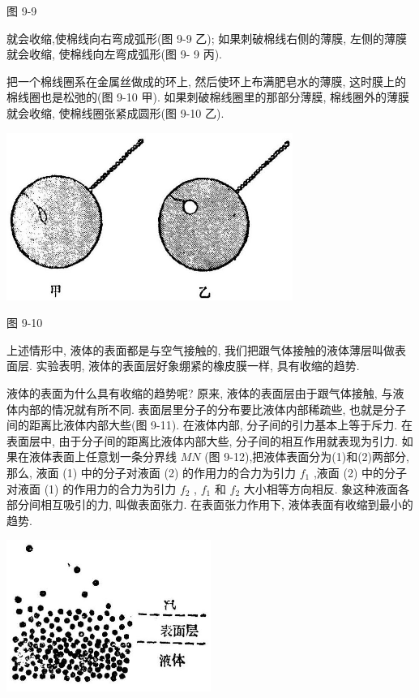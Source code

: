 \documentclass[10pt]{article}
\begin{document}
图 9-9

就会收缩,使棉线向右弯成弧形(图 9-9 乙); 如果刺破棉线右侧的薄膜, 左侧的薄膜就会收缩, 使棉线向左弯成弧形(图 9- 9 丙).

把一个棉线圈系在金属丝做成的环上, 然后使环上布满肥皂水的薄膜, 这时膜上的棉线圈也是松弛的(图 9-10 甲). 如果刺破棉线圈里的那部分薄膜, 棉线圈外的薄膜就会收缩, 使棉线圈张紧成圆形(图 9-10 乙).

\begin{center}
\includegraphics[max width=0.7\textwidth]{images/01912d55-147c-70aa-b0e0-1782a122f948_266_251482.jpg}
\end{center}

图 9-10

上述情形中, 液体的表面都是与空气接触的, 我们把跟气体接触的液体薄层叫做表面层. 实验表明, 液体的表面层好象绷紧的橡皮膜一样, 具有收缩的趋势.

液体的表面为什么具有收缩的趋势呢? 原来, 液体的表面层由于跟气体接触, 与液体内部的情况就有所不同. 表面层里分子的分布要比液体内部稀疏些, 也就是分子间的距离比液体内部大些(图 9-11). 在液体内部, 分子间的引力基本上等于斥力. 在表面层中, 由于分子间的距离比液体内部大些, 分子间的相互作用就表现为引力. 如果在液体表面上任意划一条分界线 \({MN}\) (图 9-12),把液体表面分为(1)和(2)两部分, 那么, 液面 (1) 中的分子对液面 (2) 的作用力的合力为引力 \({f}_{1}\) ,液面 (2) 中的分子对液面 (1) 的作用力的合力为引力 \({f}_{2}\) , \({f}_{1}\) 和 \({f}_{2}\) 大小相等方向相反. 象这种液面各部分间相互吸引的力, 叫做表面张力. 在表面张力作用下, 液体表面有收缩到最小的趋势.

\begin{center}
\includegraphics[max width=0.5\textwidth]{images/01912d55-147c-70aa-b0e0-1782a122f948_266_391566.jpg}
\end{center}
\end{document}
